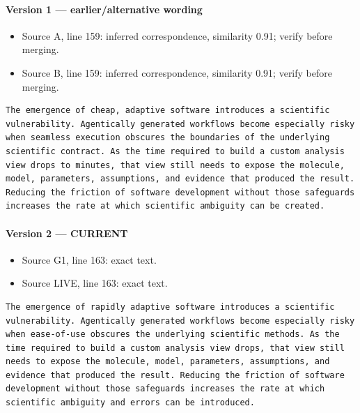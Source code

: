 \documentclass[11pt]{article}
\begin{document}
\paragraph{Version 1 --- earlier/alternative wording}

\begin{itemize}[leftmargin=*]
\item Source A, line 159: inferred correspondence, similarity 0.91; verify before merging.
\item Source B, line 159: inferred correspondence, similarity 0.91; verify before merging.
\end{itemize}

\begin{lstlisting}
The emergence of cheap, adaptive software introduces a scientific vulnerability. Agentically generated workflows become especially risky when seamless execution obscures the boundaries of the underlying scientific contract. As the time required to build a custom analysis view drops to minutes, that view still needs to expose the molecule, model, parameters, assumptions, and evidence that produced the result. Reducing the friction of software development without those safeguards increases the rate at which scientific ambiguity can be created.
\end{lstlisting}

\paragraph{Version 2 --- CURRENT}

\begin{itemize}[leftmargin=*]
\item Source G1, line 163: exact text.
\item Source LIVE, line 163: exact text.
\end{itemize}

\begin{lstlisting}
The emergence of rapidly adaptive software introduces a scientific vulnerability. Agentically generated workflows become especially risky when ease-of-use obscures the underlying scientific methods. As the time required to build a custom analysis view drops, that view still needs to expose the molecule, model, parameters, assumptions, and evidence that produced the result. Reducing the friction of software development without those safeguards increases the rate at which scientific ambiguity and errors can be introduced.
\end{lstlisting}
\end{document}
